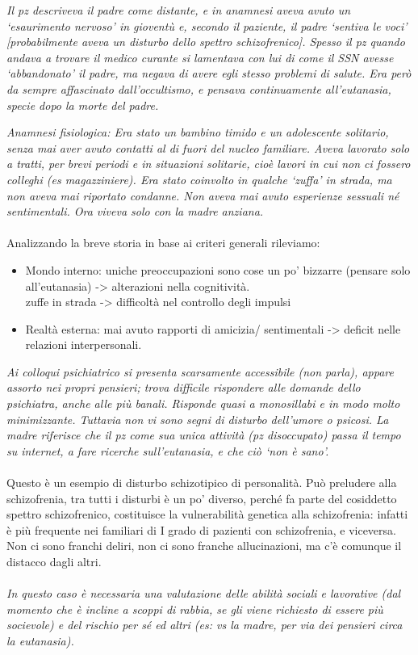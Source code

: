 \emph{Il pz descriveva il padre come distante, e in anamnesi aveva avuto
un `esaurimento nervoso' in gioventù e, secondo il paziente, il padre
`sentiva le voci' {[}probabilmente aveva un disturbo dello spettro
schizofrenico{]}. Spesso il pz quando andava a trovare il medico curante
si lamentava con lui di come il SSN avesse `abbandonato' il padre, ma
negava di avere egli stesso problemi di salute. Era però da sempre
affascinato dall'occultismo, e pensava continuamente all'eutanasia,
specie dopo la morte del padre.}

\emph{Anamnesi fisiologica: Era stato un bambino timido e un adolescente
solitario, senza mai aver avuto contatti al di fuori del nucleo
familiare. Aveva lavorato solo a tratti, per brevi periodi e in
situazioni solitarie, cioè lavori in cui non ci fossero colleghi (es
magazziniere). Era stato coinvolto in qualche `zuffa' in strada, ma non
aveva mai riportato condanne. Non aveva mai avuto esperienze sessuali né
sentimentali. Ora viveva solo con la madre anziana.}
\\\\
Analizzando la breve storia in base ai criteri generali rileviamo:

\begin{itemize}
\item
  Mondo interno: uniche preoccupazioni sono cose un po' bizzarre
  (pensare solo all'eutanasia) -\textgreater{} alterazioni nella
  cognitività.\\
  zuffe in strada -\textgreater{} difficoltà nel controllo degli impulsi
\item
  Realtà esterna: mai avuto rapporti di amicizia/ sentimentali
  -\textgreater{} deficit nelle relazioni interpersonali.
\end{itemize}

\emph{Ai colloqui psichiatrico si presenta scarsamente accessibile (non
parla), appare assorto nei propri pensieri; trova difficile rispondere
alle domande dello psichiatra, anche alle più banali. Risponde quasi a
monosillabi e in modo molto minimizzante. Tuttavia non vi sono segni di
disturbo dell'umore o psicosi. La madre riferisce che il pz come sua
unica attività (pz disoccupato) passa il tempo su internet, a fare
ricerche sull'eutanasia, e che ciò `non è sano'.}
\\\\
Questo è un esempio di disturbo schizotipico di personalità. Può
preludere alla schizofrenia, tra tutti i disturbi è un po' diverso,
perché fa parte del cosiddetto spettro schizofrenico, costituisce la
vulnerabilità genetica alla schizofrenia: infatti è più frequente nei
familiari di I grado di pazienti con schizofrenia, e viceversa. Non ci
sono franchi deliri, non ci sono franche allucinazioni, ma c'è comunque
il distacco dagli altri.
\\\\
\emph{In questo caso è necessaria una valutazione delle abilità sociali
e lavorative (dal momento che è incline a scoppi di rabbia, se gli viene
richiesto di essere più socievole) e del rischio per sé ed altri (es: vs
la madre, per via dei pensieri circa la eutanasia).}

